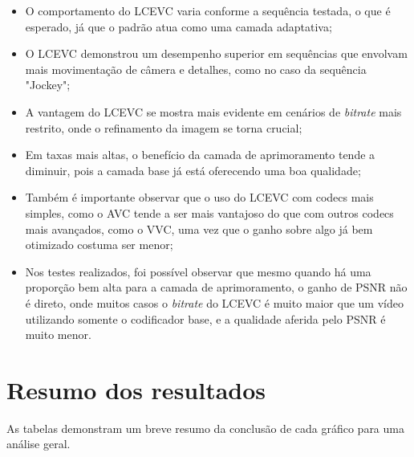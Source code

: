 \begin{itemize}
    \item O comportamento do \acrshort{LCEVC} varia conforme a sequência testada, o
    que é esperado, já que o padrão atua como uma camada adaptativa;

    \item O \acrshort{LCEVC} demonstrou um desempenho superior em sequências que
    envolvam mais movimentação de câmera e detalhes, como no caso da sequência "Jockey";
    
    \item A vantagem do \acrshort{LCEVC}  se mostra mais evidente em cenários de
    \textit{bitrate} mais restrito, onde o refinamento da imagem se torna crucial;

    \item Em taxas mais altas, o benefício da camada de aprimoramento tende a diminuir,
    pois a camada base já está oferecendo uma boa qualidade;

    \item Também é importante observar que o uso do \acrshort{LCEVC} com codecs mais
    simples, como o \acrshort{AVC} tende a ser mais vantajoso do que com outros codecs
    mais avançados, como o \acrshort{VVC}, uma vez que o ganho sobre algo já bem
    otimizado costuma ser menor;

    \item Nos testes realizados, foi possível observar que mesmo quando há uma proporção
    bem alta para a camada de aprimoramento, o ganho de \acrshort{PSNR} não é direto, onde
    muitos casos o \textit{bitrate} do \acrshort{LCEVC} é muito maior que um vídeo utilizando
    somente o codificador base, e a qualidade aferida pelo \acrshort{PSNR} é muito menor.
\end{itemize}

\newpage
\section{Resumo dos resultados}

As tabelas demonstram um breve resumo da conclusão de cada gráfico para uma análise 
geral.

